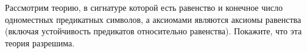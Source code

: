 Рассмотрим теорию, в сигнатуре которой есть равенство и конечное число одноместных предикатных символов,
а аксиомами являются аксиомы равенства (включая устойчивость предикатов относительно
равенства). Покажите, что эта теория разрешима.
